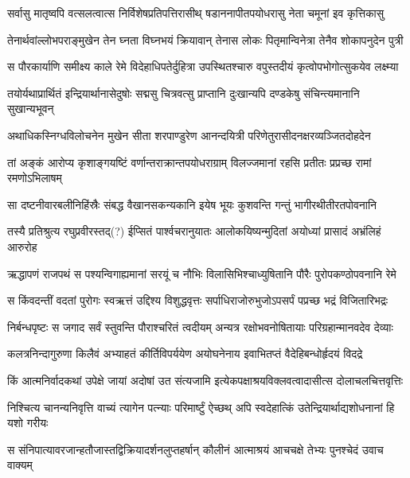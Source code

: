 \twolineshloka
{सर्वासु मातृष्वपि वत्सलत्वात्स निर्विशेषप्रतिपत्तिरासीथ्}
{षडाननापीतपयोधरासु नेता चमूनां इव कृत्तिकासु}%

\twolineshloka
{तेनार्थवांल्लोभपराङ्मुखेन तेन घ्नता विघ्नभयं क्रियावान्}
{तेनास लोकः पितृमान्विनेत्रा तेनैव शोकापनुदेन पुत्री}%

\twolineshloka
{स पौरकार्याणि समीक्ष्य काले रेमे विदेहाधिपतेर्दुहित्रा}
{उपस्थितश्चारु वपुस्तदीयं कृत्वोपभोगोत्सुकयेव लक्ष्म्या}%

\twolineshloka
{तयोर्यथाप्रार्थितं इन्द्रियार्थानासेदुषोः सद्मसु चित्रवत्सु}
{प्राप्तानि दुःखान्यपि दण्डकेषु संचिन्त्यमानानि सुखान्यभूवन्}%

\twolineshloka
{अथाधिकस्निग्धविलोचनेन मुखेन सीता शरपाण्डुरेण}
{आनन्दयित्री परिणेतुरासीदनक्षरव्यञ्जितदोहदेन}%

\twolineshloka
{तां अङ्कं आरोप्य कृशाङ्गयष्टिं वर्णान्तराक्रान्तपयोधराग्राम्}
{विलज्जमानां रहसि प्रतीतः प्रप्रच्छ रामां रमणोऽभिलाषम्}%

\twolineshloka
{सा दष्टनीवारबलीनिहिंस्रैः संबद्ध वैखानसकन्यकानि}
{इयेष भूयः कुशवन्ति गन्तुं भागीरथीतीरतपोवनानि}%

\twolineshloka
{तस्यै प्रतिश्रुत्य रघुप्रवीरस्तद्(?) ईप्सितं पार्श्वचरानुयातः}
{आलोकयिष्यन्मुदितां अयोध्यां प्रासादं अभ्रंलिहं आरुरोह}%

\twolineshloka
{ऋद्धापणं राजपथं स पश्यन्विगाह्यमानां सरयूं च नौभिः}
{विलासिभिश्चाध्युषितानि पौरैः पुरोपकण्ठोपवनानि रेमे}%

\twolineshloka
{स किंवदन्तीं वदतां पुरोगः स्वऋत्तं उद्दिश्य विशुद्धवृत्तः}
{सर्पाधिराजोरुभुजोऽपसर्पं पप्रच्छ भद्रं विजितारिभद्रः}%

\twolineshloka
{निर्बन्धपृष्टः स जगाद सर्वं स्तुवन्ति पौराश्चरितं त्वदीयम्}
{अन्यत्र रक्षोभवनोषितायाः परिग्रहान्मानवदेव देव्याः}%

\twolineshloka
{कलत्रनिन्दागुरुणा किलैवं अभ्याहतं कीर्तिविपर्ययेण}
{अयोघनेनाय इवाभितप्तं वैदेहिबन्धोर्हृदयं विदद्रे}%

\twolineshloka
{किं आत्मनिर्वादकथां उपेक्षे जायां अदोषां उत संत्यजामि}
{इत्येकपक्षाश्रयविक्लवत्वादासीत्स दोलाचलचित्तवृत्तिः}%

\twolineshloka
{निश्चित्य चानन्यनिवृत्ति वाच्यं त्यागेन पत्न्याः परिमार्ष्टुं ऐच्छथ्}
{अपि स्वदेहात्किं उतेन्द्रियार्थाद्यशोधनानां हि यशो गरीयः}%

\twolineshloka
{स संनिपात्यावरजान्हतौजास्तद्विक्रियादर्शनलुप्तहर्षान्}
{कौलीनं आत्माश्रयं आचचक्षे तेभ्यः पुनश्चेदं उवाच वाक्यम्}%

